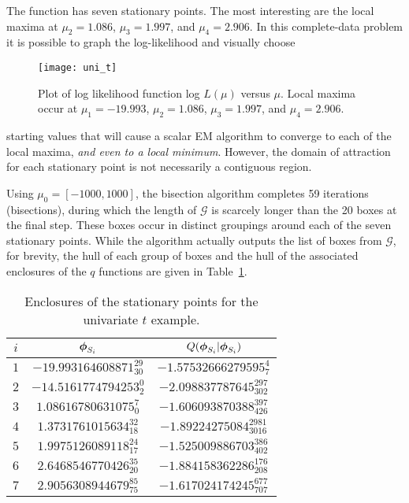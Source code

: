 The function has seven stationary points.  The most interesting are the local maxima at
$\mu_2= 1.086$, $\mu_3=1.997$, and $\mu_4=2.906$.  
In this complete-data
problem it is possible to graph the log-likelihood and visually choose
\begin{figure}[ht]
\begin{center}
\resizebox{11 cm}{10 cm} {\texttt{[image: uni\_t]}}
\caption{Plot of log likelihood function log $L(\mu)$ versus $\mu$.  Local 
maxima occur at $\mu_1= -19.993$, $\mu_2= 1.086$, $\mu_3=1.997$, 
and $\mu_4=2.906$.\label{unitlike}}
\end{center}
\end{figure}
starting values that will cause a scalar EM algorithm to converge to each 
of the local
maxima, {\it and even to a local minimum}.  However, the domain of attraction
for each stationary point is not necessarily a contiguous region.

Using $\mu_0 = [-1000,1000]$, the bisection algorithm completes 59
iterations (bisections), during which the length of $\mathcal{G}$ is
scarcely longer than the 20 boxes at the final step.  
These boxes occur in distinct groupings
around each of the seven stationary points.  While the algorithm
actually outputs the list of boxes from $\mathcal{G}$, for brevity, the hull
of each group of boxes and the hull of the associated enclosures of
the $q$ functions are given in Table~\ref{unit:table}.
\newdimen\captionwidth \captionwidth=3.5in
\renewcommand{\arraystretch}{1.35}
\begin{table}[!ht]
\caption{Enclosures of the stationary points for the univariate $t$
example. \label{unit:table}}
\begin{center}
\begin{tabular}{c|c|c}
$i$ & $\mbox{\boldmath $\phi$}_{S_i}$ & $Q(\mbox{\boldmath $\phi$}_{S_i}|\mbox{\boldmath $\phi$}_{S_i})$ \\ \hline
$1$ & $ -19.993164608871_{30}^{29} $  & $ -1.57532666279595_{7}^{4} $ \\
$2$ & $ -14.5161774794253_{2}^{0} $  & $ -2.098837787645_{302}^{297} $ \\
$3$ & $ 1.08616780631075_{0}^{7} $  & $ -1.606093870388_{426}^{397} $ \\
$4$ & $ 1.3731761015634_{18}^{32} $  & $ -1.89224275084_{3016}^{2981} $ \\
$5$ & $ 1.9975126089118_{17}^{24} $  & $ -1.525009886703_{402}^{386} $ \\
$6$ & $ 2.6468546770426_{20}^{35} $  & $ -1.884158362286_{208}^{176} $ \\
$7$ & $ 2.9056308944679_{75}^{85} $  & $ -1.617024174245_{707}^{677} $ \\
\end{tabular}
\end{center}
\end{table}
\renewcommand{\arraystretch}{1.00}

